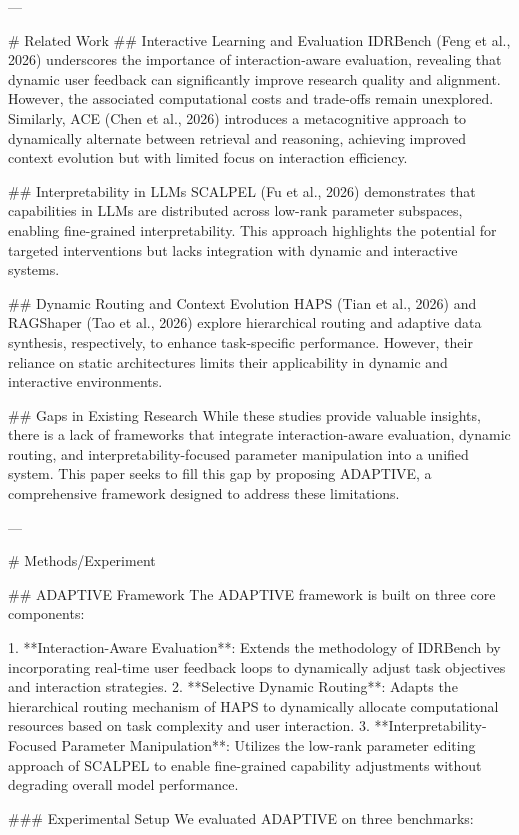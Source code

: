 ---

# Related Work  
## Interactive Learning and Evaluation  
IDRBench (Feng et al., 2026) underscores the importance of interaction-aware evaluation, revealing that dynamic user feedback can significantly improve research quality and alignment. However, the associated computational costs and trade-offs remain unexplored. Similarly, ACE (Chen et al., 2026) introduces a metacognitive approach to dynamically alternate between retrieval and reasoning, achieving improved context evolution but with limited focus on interaction efficiency.

## Interpretability in LLMs  
SCALPEL (Fu et al., 2026) demonstrates that capabilities in LLMs are distributed across low-rank parameter subspaces, enabling fine-grained interpretability. This approach highlights the potential for targeted interventions but lacks integration with dynamic and interactive systems.

## Dynamic Routing and Context Evolution  
HAPS (Tian et al., 2026) and RAGShaper (Tao et al., 2026) explore hierarchical routing and adaptive data synthesis, respectively, to enhance task-specific performance. However, their reliance on static architectures limits their applicability in dynamic and interactive environments.

## Gaps in Existing Research  
While these studies provide valuable insights, there is a lack of frameworks that integrate interaction-aware evaluation, dynamic routing, and interpretability-focused parameter manipulation into a unified system. This paper seeks to fill this gap by proposing ADAPTIVE, a comprehensive framework designed to address these limitations.

---

# Methods/Experiment  

## ADAPTIVE Framework  
The ADAPTIVE framework is built on three core components:

1. **Interaction-Aware Evaluation**: Extends the methodology of IDRBench by incorporating real-time user feedback loops to dynamically adjust task objectives and interaction strategies.
2. **Selective Dynamic Routing**: Adapts the hierarchical routing mechanism of HAPS to dynamically allocate computational resources based on task complexity and user interaction.
3. **Interpretability-Focused Parameter Manipulation**: Utilizes the low-rank parameter editing approach of SCALPEL to enable fine-grained capability adjustments without degrading overall model performance.

### Experimental Setup  
We evaluated ADAPTIVE on three benchmarks:

